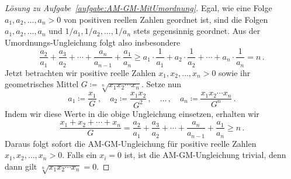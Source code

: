 \begin{proof}[Lösung zu Aufgabe~\ref{aufgabe:AM-GM-MitUmordnung}]
	 Egal, wie eine Folge $a_1,a_2,\dotsc,a_n>0$ von positiven reellen Zahlen geordnet ist, sind die Folgen $a_1,a_2,\dotsc,a_n$ und $1/a_1,1/a_2,\dotsc,1/a_n$ stets gegensinnig geordnet. Aus der Umordnungs-Ungleichung folgt also insbesondere
	\begin{equation*}
		\frac{a_2}{a_1}+\frac{a_3}{a_2}+\dotsb+\frac{a_n}{a_{n-1}}+\frac{a_1}{a_n}\geqslant a_1\cdot \frac{1}{a_1}+a_2\cdot \frac1{a_2}+\dotsb+a_n\cdot \frac{1}{a_n}= n\,.
	\end{equation*}
	Jetzt betrachten wir positive reelle Zahlen $x_1,x_2,\dotsc,x_n>0$ sowie ihr geometrisches Mittel $G\coloneqq \sqrt[n]{x_1x_2\dotsm x_n}$. Setze nun
	\begin{equation*}
		a_1\coloneqq \frac{x_1}{G}\,,\quad a_2\coloneqq \frac{x_1x_2}{G^2}\,,\quad\dotsc\,,\quad a_n\coloneqq \frac{x_1x_2\dotsm x_n}{G^n}\,.
	\end{equation*}
	Indem wir diese Werte in die obige Ungleichung einsetzen, erhalten wir
	\begin{equation*}
		\frac{x_1+x_2+\dotsb+x_n}{G}=\frac{a_2}{a_1}+\frac{a_3}{a_2}+\dotsb+\frac{a_n}{a_{n-1}}+\frac{a_1}{a_n}\geqslant n\,.
	\end{equation*}
	Daraus folgt sofort die AM-GM-Ungleichung für positive reelle Zahlen $x_1,x_2,\dotsc,x_n>0$. Falls ein $x_i=0$ ist, ist die AM-GM-Ungleichung trivial, denn dann gilt $\sqrt[n]{x_1x_2\dotsm x_n}=0$.
\end{proof}